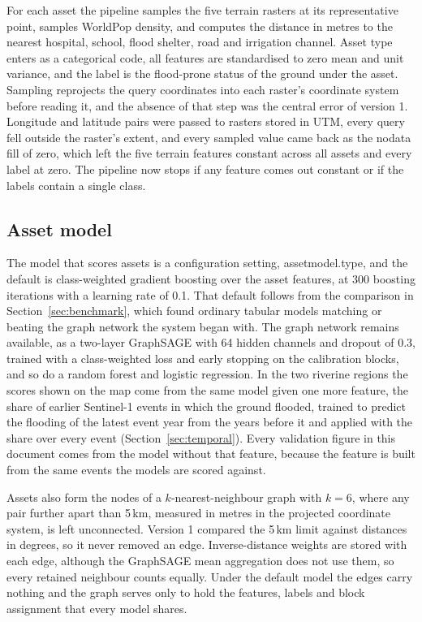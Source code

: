 \documentclass[10pt,a4paper,twocolumn]{article}
\makeatletter
\let\orig@texttt\texttt
\renewcommand{\texttt}[1]{%
  \ifmmode\text{\orig@texttt{#1}}\else
  \begingroup\ttfamily\def\_{\textunderscore\allowbreak}#1\endgroup\fi}
\makeatother
\begin{document}
For each asset the pipeline samples the five terrain rasters at its representative point, samples WorldPop density, and computes the distance in metres to the nearest hospital, school, flood shelter, road and irrigation channel. Asset type enters as a categorical code, all features are standardised to zero mean and unit variance, and the label is the flood-prone status of the ground under the asset. Sampling reprojects the query coordinates into each raster's coordinate system before reading it, and the absence of that step was the central error of version 1. Longitude and latitude pairs were passed to rasters stored in UTM, every query fell outside the raster's extent, and every sampled value came back as the nodata fill of zero, which left the five terrain features constant across all assets and every label at zero. The pipeline now stops if any feature comes out constant or if the labels contain a single class.

\subsection{Asset model}
\label{sec:gnn}

The model that scores assets is a configuration setting, \texttt{asset\_model.type}, and the default is class-weighted gradient boosting over the asset features, at 300 boosting iterations with a learning rate of 0.1. That default follows from the comparison in Section~\ref{sec:benchmark}, which found ordinary tabular models matching or beating the graph network the system began with. The graph network remains available, as a two-layer GraphSAGE with 64 hidden channels and dropout of 0.3, trained with a class-weighted loss and early stopping on the calibration blocks, and so do a random forest and logistic regression. In the two riverine regions the scores shown on the map come from the same model given one more feature, the share of earlier Sentinel-1 events in which the ground flooded, trained to predict the flooding of the latest event year from the years before it and applied with the share over every event (Section~\ref{sec:temporal}). Every validation figure in this document comes from the model without that feature, because the feature is built from the same events the models are scored against.

Assets also form the nodes of a $k$-nearest-neighbour graph with $k=6$, where any pair further apart than 5\,km, measured in metres in the projected coordinate system, is left unconnected. Version 1 compared the 5\,km limit against distances in degrees, so it never removed an edge. Inverse-distance weights are stored with each edge, although the GraphSAGE mean aggregation does not use them, so every retained neighbour counts equally. Under the default model the edges carry nothing and the graph serves only to hold the features, labels and block assignment that every model shares.
\end{document}
